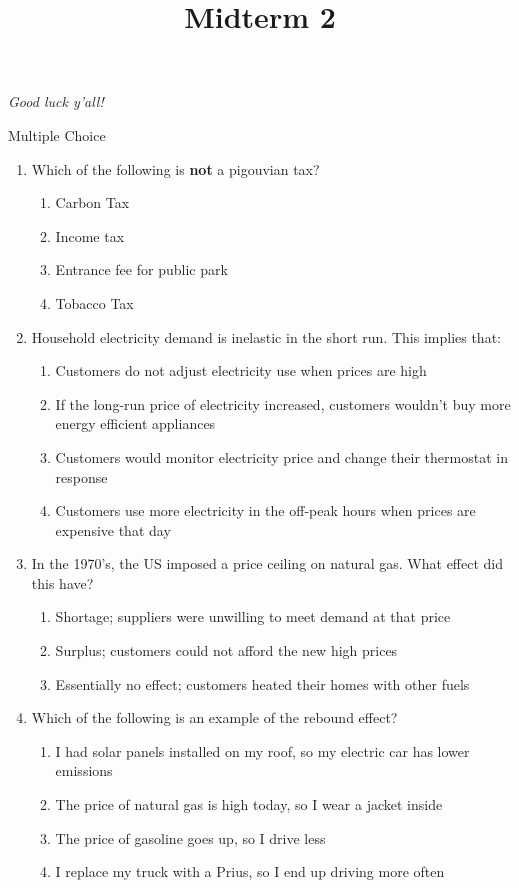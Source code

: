 \documentclass[11pt]{article}
\title{Midterm 2}
\newcommand{\answer}[1]{\iftoggle{INCLUDEANSWERS}{{\color{violet!70!white}\textbf{Solution:} #1}}{} }
\newcommand{\points}[1]{\iftoggle{INCLUDEPOINTS}{{\color{blue!70!white}(#1 pts.)}}{}}
\begin{document}
  
\emph{Good luck y'all!}

\vspace*{5mm}
Multiple Choice

\begin{enumerate}
  \item \points{4} Which of the following is \textbf{not} a pigouvian tax?
  \begin{enumerate}
    \item Carbon Tax
    \item Income tax
    \item Entrance fee for public park
    \item Tobacco Tax
  \end{enumerate}

  \answer{(b)}

  \item \points{4} Household electricity demand is inelastic in the short run. This implies that:
  
  \begin{enumerate}
    \item Customers do not adjust electricity use when prices are high
    \item If the long-run price of electricity increased, customers wouldn't buy more energy efficient appliances
    \item Customers would monitor electricity price and change their thermostat in response
    \item Customers use more electricity in the off-peak hours when prices are expensive that day
  \end{enumerate}
    
  \answer{(a)}

  \item \points{4} In the 1970’s, the US imposed a price ceiling on natural gas. What effect did this have?

  \begin{enumerate}
    \item Shortage; suppliers were unwilling to meet demand at that price
    \item Surplus; customers could not afford the new high prices
    \item Essentially no effect; customers heated their homes with other fuels
  \end{enumerate}

  \answer{(a)}

  \item \points{4} Which of the following is an example of the rebound effect?
  \begin{enumerate}
    \item   I had solar panels installed on my roof, so my electric car has lower emissions
    \item The price of natural gas is high today, so I wear a jacket inside
    \item The price of gasoline goes up, so I drive less
    \item I replace my truck with a Prius, so I end up driving more often
  \end{enumerate}

  \answer{(d)}
\end{enumerate}
\end{document}
